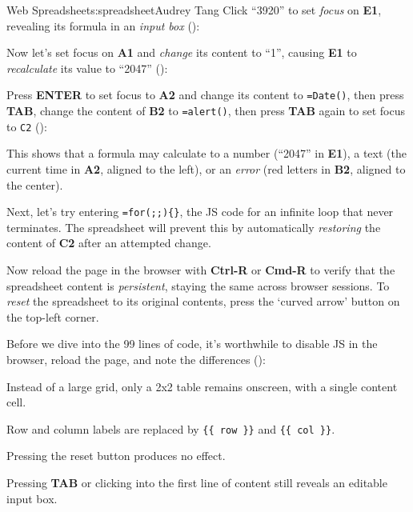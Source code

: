 \begin{aosachapter}{Web Spreadsheet}{s:spreadsheet}{Audrey Tang}
Click ``3920'' to set \emph{focus} on \textbf{E1}, revealing its formula
in an \emph{input box} ():


Now let's set focus on \textbf{A1} and \emph{change} its content to
``1'', causing \textbf{E1} to \emph{recalculate} its value to ``2047''
():


Press \textbf{ENTER} to set focus to \textbf{A2} and change its content
to \texttt{=Date()}, then press \textbf{TAB}, change the content of
\textbf{B2} to \texttt{=alert()}, then press \textbf{TAB} again to set
focus to \texttt{C2} ():


This shows that a formula may calculate to a number (``2047'' in
\textbf{E1}), a text (the current time in \textbf{A2}, aligned to the
left), or an \emph{error} (red letters in \textbf{B2}, aligned to the
center).

Next, let's try entering \texttt{=for(;;)\{\}}, the JS code for an
infinite loop that never terminates. The spreadsheet will prevent this
by automatically \emph{restoring} the content of \textbf{C2} after an
attempted change.

Now reload the page in the browser with \textbf{Ctrl-R} or
\textbf{Cmd-R} to verify that the spreadsheet content is
\emph{persistent}, staying the same across browser sessions. To
\emph{reset} the spreadsheet to its original contents, press the `curved
arrow' button on the top-left corner.

\label{progressive-enhancement}

Before we dive into the 99 lines of code, it's worthwhile to disable JS
in the browser, reload the page, and note the differences
():

\begin{aosaitemize}

\item
  Instead of a large grid, only a 2x2 table remains onscreen, with a
  single content cell.
\item
  Row and column labels are replaced by \texttt{\{\{ row \}\}} and
  \texttt{\{\{ col \}\}}.
\item
  Pressing the reset button produces no effect.
\item
  Pressing \textbf{TAB} or clicking into the first line of content still
  reveals an editable input box.
\end{aosaitemize}


\end{aosachapter}

